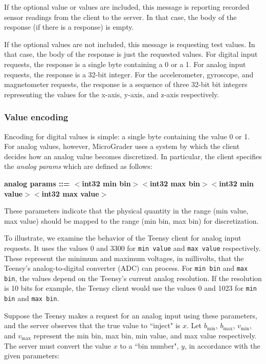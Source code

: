 \documentclass[12pt]{article}
\begin{document}
\begin{appendices}
If the optional value or values are included, this message is reporting recorded sensor readings from the client to the server.  In that case, the body of the response (if there is a response) is empty.  

If the optional values are not included, this message is requesting test values.  In that case, the body of the response is just the requested values.  For digital input requests, the response is a single byte containing a 0 or a 1.  For analog input requests, the response is a 32-bit integer.  For the accelerometer, gyroscope, and magnetometer requests, the response is a sequence of three 32-bit bit integers representing the values for the x-axis, y-axis, and z-axis respectively.

\subsubsection{Value encoding}
Encoding for digital values is simple: a single byte containing the value 0 or 1.  For analog values, however, MicroGrader uses a system by which the client decides how an analog value becomes discretized.  In particular, the client specifies the \textit{analog params} which are defined as follows:

\footnotesize
\textbf{analog params ::= $<$int32 min bin$>$$<$int32 max bin$>$$<$int32 min value$>$$<$int32 max value$>$}
\normalsize

\noindent These parameters indicate that the physical quantity in the range (min value, max value) should be mapped to the range (min bin, max bin) for discretization.

To illustrate, we examine the behavior of the Teensy client for analog input requests.  It uses the values 0 and 3300 for \texttt{min value} and \texttt{max value} respectively.  These represent the minimum and maximum voltages, in millivolts, that the Teensy's analog-to-digital converter (ADC) can process.  For \texttt{min bin} and \texttt{max bin}, the values depend on the Teensy's current analog resolution.  If the resolution is 10 bits for example, the Teensy client would use the values 0 and 1023 for \texttt{min bin} and \texttt{max bin}.

Suppose the Teensy makes a request for an analog input using these parameters, and the server observes that the true value to ``inject" is $x$.  Let $b_{\text{min}}$, $b_{\text{max}}$, $v_{\text{min}}$, and $v_{\text{max}}$ represent the min bin, max bin, min value, and max value respectively.  The server must convert the value $x$ to a ``bin number", $y$, in accordance with the given parameters:


\end{appendices}
\end{document}
